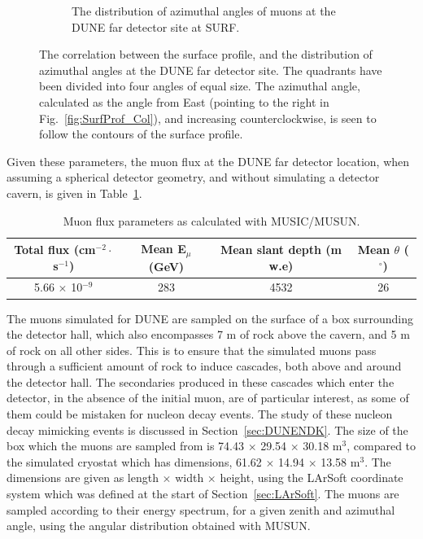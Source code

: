 \begin{figure}
\begin{subfigure}{0.4\textwidth}
    \caption{The distribution of azimuthal angles of muons at the DUNE far detector site at SURF.}
    \label{fig:SurfProf_Azi}
  \end{subfigure}%
  \caption[The correlation between the surface profile, and the distribution of azimuthal angles at the DUNE far detector site]
          {The correlation between the surface profile, and the distribution of azimuthal angles at the DUNE far detector site. The quadrants have been divided into four angles of equal size. The azimuthal angle, calculated as the angle from East (pointing to the right in Fig.~\ref{fig:SurfProf_Col}), and increasing counterclockwise, is seen to follow the contours of the surface profile.}
\end{figure}

Given these parameters, the muon flux at the DUNE far detector location, when assuming a spherical detector geometry, and without simulating a detector cavern, is given in Table~\ref{tab:MUSUNflux}. \\
\begin{table}
  \caption[Muon flux parameters as calculated with MUSIC/MUSUN.]
          {Muon flux parameters as calculated with MUSIC/MUSUN.}
  \centering
  \label{tab:MUSUNflux}
  \begin{tabular}{c c c c}
    \toprule
        {Total flux (cm$^{-2}\cdot$s$^{-1}$)} & {Mean E$_{\mu}$ (GeV)} & {Mean slant depth (m w.e)} & {Mean $\theta$ ($^{\circ}$)} \\ 
        \midrule
        5.66 $\times$ 10$^{-9}$           & 283                    & 4532                       & 26                           \\
    \bottomrule
  \end{tabular}
\end{table}

The muons simulated for DUNE are sampled on the surface of a box surrounding the detector hall, which also encompasses 7 m of rock above the cavern, and 5 m of rock on all other sides. This is to ensure that the simulated muons pass through a sufficient amount of rock to induce cascades, both above and around the detector hall. The secondaries produced in these cascades which enter the detector, in the absence of the initial muon, are of particular interest, as some of them could be mistaken for nucleon decay events. The study of these nucleon decay mimicking events is discussed in Section~\ref{sec:DUNENDK}. The size of the box which the muons are sampled from is 74.43 $\times$ 29.54 $\times$ 30.18 m$^3$, compared to the simulated cryostat which has dimensions, 61.62 $\times$ 14.94 $\times$ 13.58 m$^3$. The dimensions are given as length $\times$ width $\times$ height, using the LArSoft coordinate system which was defined at the start of Section~\ref{sec:LArSoft}. The muons are sampled according to their energy spectrum, for a given zenith and azimuthal angle, using the angular distribution obtained with MUSUN. \\

